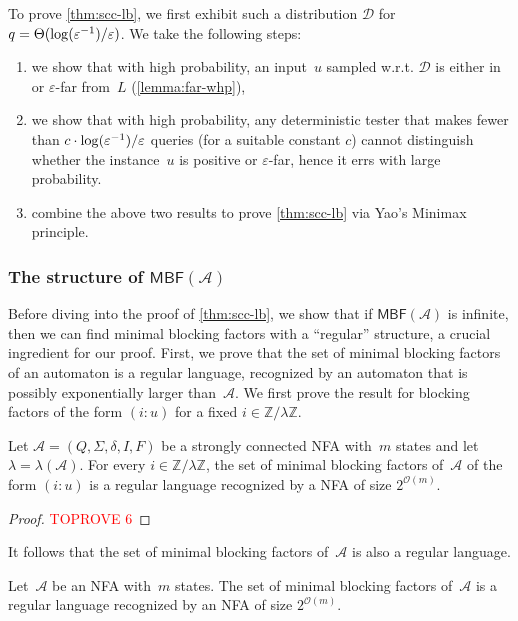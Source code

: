 \documentclass[letterpaper, USenglish, cleveref, autoref, thm-restate, numberwithinsect]{lipics-v2021}
\theoremstyle{theorem}
\theoremstyle{definition}
\newcommand{\Aa}{\mathcal{A}}
\newcommand{\cO}{\mathcal{O}}
\newcommand{\Dd}{\mathcal{D}}
\newcommand{\eps}{\varepsilon}
\newcommand{\MBF}{\textsf{MBF}\xspace}
\newcommand{\timedword}[2]{(#1:#2)}
\newcommand{\ZZ}{\mathbb{Z}}
\newcommand{\epslogeps}[1][]
{\ifthenelse{\equal{#1}{}}{\log(\eps^{-1})/\eps}{\log^{ #1 }(\eps^{-1})/\eps}}
\begin{document}
To prove \cref{thm:scc-lb}, we first exhibit such a distribution $\Dd$ for $q = \Theta(\epslogeps)$.
We take the following steps:
\begin{enumerate}
    \item we show that with high probability, an input~$u$ sampled w.r.t. $\Dd$ is either in or $\eps$-far from~$L$ (\cref{lemma:far-whp}),
    \item we show that with high probability, any deterministic tester that makes fewer than $c \cdot \epslogeps$ queries (for a suitable constant $c$) cannot distinguish whether the instance~$u$ is positive or $\eps$-far, hence it errs with large probability.
    \item combine the above two results to prove \cref{thm:scc-lb} via Yao's Minimax principle.
\end{enumerate}


\subsubsection{The structure of $\MBF(\Aa)$}
Before diving into the proof of \cref{thm:scc-lb}, we show that if $\MBF(\Aa)$ is infinite, then we can find minimal blocking factors with a ``regular'' structure, a crucial ingredient for our proof.
First, we prove that the set of minimal blocking factors of an automaton is a regular language, recognized by an automaton that is possibly exponentially larger than~$\Aa$.
We first prove the result for blocking factors of the form $\timedword{i}{u}$ for a fixed $i\in\ZZ/\lambda\ZZ$.
\begin{lemma}\label{lemma:blocking-regular}
    Let $\Aa = (Q, \Sigma, \delta, I, F)$ be a strongly connected NFA with~$m$ states and let $\lambda = \lambda(\Aa)$.
    For every $i \in\ZZ/\lambda\ZZ$, the set of minimal blocking factors of~$\Aa$ of the form $\timedword{i}{u}$ is a regular language recognized by a NFA of size $2^{\cO(m)}$.
\end{lemma}
\begin{proof}\textcolor{red}{TOPROVE 6}\end{proof}

It follows that the set of minimal blocking factors of~$\Aa$ is also a regular language.
\begin{corollary}
   Let~$\Aa$ be an NFA with~$m$ states.
   The set of minimal blocking factors of~$\Aa$ is a regular language recognized by an NFA of size $2^{\cO(m)}$.
\end{corollary}
\end{document}
